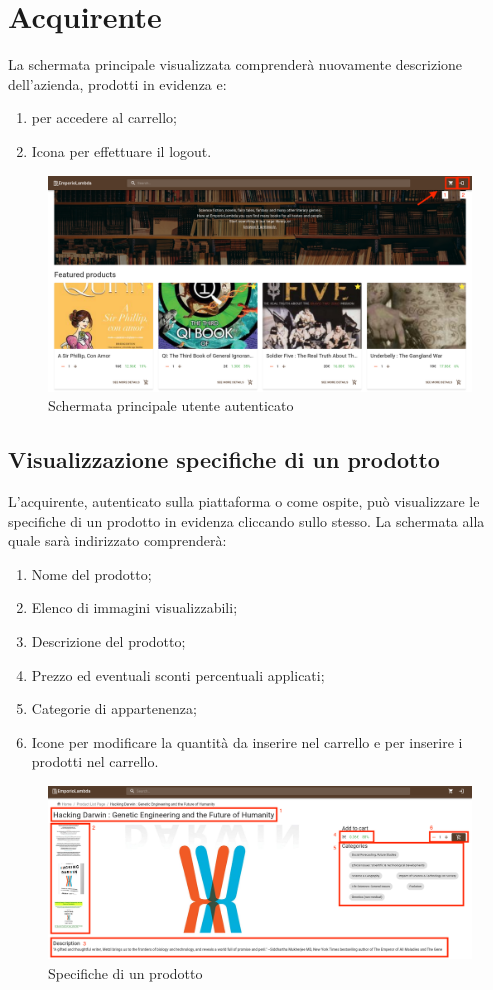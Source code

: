 \section{Acquirente}\label{Acquirente}
La schermata principale visualizzata comprenderà nuovamente descrizione dell'azienda, prodotti in evidenza e:
\begin{enumerate}
	\item {} per accedere al carrello;
	\item Icona per effettuare il logout. 
\end{enumerate} 
\begin{figure}[H]
	\centering
	\includegraphics[scale=0.25]{Immagini/Acquirente/home.customer.png}
	\caption{Schermata principale utente autenticato}
	\label{fig:Homecustomer}
\end{figure}
\subsection{Visualizzazione specifiche di un prodotto}
L'acquirente, autenticato sulla piattaforma o come ospite, può visualizzare le specifiche di un prodotto in evidenza cliccando sullo stesso. La schermata alla quale sarà indirizzato comprenderà:
\begin{enumerate}
	\item Nome del prodotto;
	\item Elenco di immagini visualizzabili;
	\item Descrizione del prodotto;
	\item Prezzo ed eventuali sconti percentuali applicati;
	\item Categorie di appartenenza;
	\item Icone per modificare la quantità da inserire nel carrello e per inserire i prodotti nel carrello.
\end{enumerate} 
\begin{figure}[H]
	\centering
	\includegraphics[scale=0.25]{Immagini/Acquirente/pdp.customer.png}
	\caption{Specifiche di un prodotto}
	\label{fig:SpecificheProdotto}
\end{figure}
